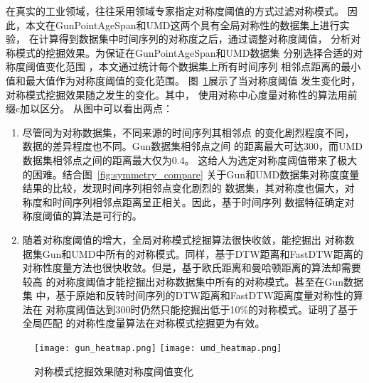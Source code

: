 在真实的工业领域，往往采用领域专家指定对称度阈值的方式过滤对称模式。
因此，本文在GunPointAgeSpan和UMD这两个具有全局对称性的数据集上进行实验，
在计算得到数据集中时间序列的对称度之后，通过调整对称度阈值，
分析对称模式的挖掘效果。为保证在GunPointAgeSpan和UMD数据集
分别选择合适的对称度阈值变化范围
，本文通过统计每个数据集上所有时间序列
相邻点距离的最小值和最大值作为对称度阈值的变化范围。
图~\ref{fig:symmetry_heatmap}展示了当对称度阈值
发生变化时，对称模式挖掘效果随之发生的变化。其中，
使用对称中心度量对称性的算法用前缀c加以区分。
从图中可以看出两点：
\begin{enumerate}
  \item 尽管同为对称数据集，不同来源的时间序列其相邻点
  的变化剧烈程度不同，数据的差异程度也不同。Gun数据集相邻点之间
  的距离最大可达300，而UMD数据集相邻点之间的距离最大仅为0.4。
  这给人为选定对称度阈值带来了极大的困难。结合图~\ref{fig:symmetry_compare}
  关于Gun和UMD数据集对称度度量结果的比较，发现时间序列相邻点变化剧烈的
  数据集，其对称度也偏大，对称度和时间序列相邻点距离呈正相关。因此，基于时间序列
  数据特征确定对称度阈值的算法是可行的。
  \item 随着对称度阈值的增大，全局对称模式挖掘算法很快收敛，能挖掘出
  对称数据集Gun和UMD中所有的对称模式。同样，基于DTW距离和FastDTW距离的
  对称性度量方法也很快收敛。但是，基于欧氏距离和曼哈顿距离的算法却需要较高
  的对称度阈值才能挖掘出对称数据集中所有的对称模式。甚至在Gun数据集
  中，基于原始和反转时间序列的DTW距离和FastDTW距离度量对称性的算法在
  对称度阈值达到300时仍然只能挖掘出低于10\%的对称模式。证明了基于全局匹配
  的对称性度量算法在对称模式挖掘更为有效。

\end{enumerate}
\begin{figure}
  \centering
  {\texttt{[image: gun\_heatmap.png]}}
  {\texttt{[image: umd\_heatmap.png]}}
  \caption{对称模式挖掘效果随对称度阈值变化}
  \label{fig:symmetry_heatmap}
\end{figure}

